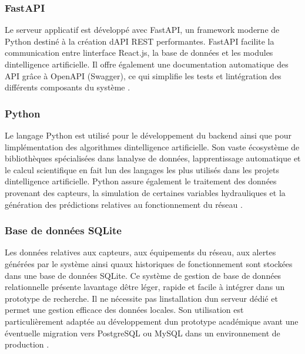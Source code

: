 \subsubsection{FastAPI}\label{b-fastapi}

Le serveur applicatif est développé avec FastAPI, un framework moderne
de Python destiné à la création d\textquotesingle API REST performantes.
FastAPI facilite la communication entre l\textquotesingle interface
React.js, la base de données et les modules
d\textquotesingle intelligence artificielle. Il offre également une
documentation automatique des API grâce à OpenAPI (Swagger), ce qui
simplifie les tests et l\textquotesingle intégration des différents
composants du système \cite{ref116}.

\subsubsection{Python}\label{c-python}

Le langage Python est utilisé pour le développement du backend ainsi que
pour l\textquotesingle implémentation des algorithmes
d\textquotesingle intelligence artificielle. Son vaste écosystème de
bibliothèques spécialisées dans l\textquotesingle analyse de données,
l\textquotesingle apprentissage automatique et le calcul scientifique en
fait l\textquotesingle un des langages les plus utilisés dans les
projets d\textquotesingle intelligence artificielle. Python assure
également le traitement des données provenant des capteurs, la
simulation de certaines variables hydrauliques et la génération des
prédictions relatives au fonctionnement du réseau \cite{ref117}.

\subsubsection{Base de données
	SQLite}\label{d-base-de-donnuxe9es-sqlite}

Les données relatives aux capteurs, aux équipements du réseau, aux
alertes générées par le système ainsi qu\textquotesingle aux historiques
de fonctionnement sont stockées dans une base de données SQLite. Ce
système de gestion de base de données relationnelle présente
l\textquotesingle avantage d\textquotesingle être léger, rapide et
facile à intégrer dans un prototype de recherche. Il ne nécessite pas
l\textquotesingle installation d\textquotesingle un serveur dédié et
permet une gestion efficace des données locales. Son utilisation est
particulièrement adaptée au développement d\textquotesingle un prototype
académique avant une éventuelle migration vers PostgreSQL ou MySQL dans
un environnement de production \cite{ref118}.

